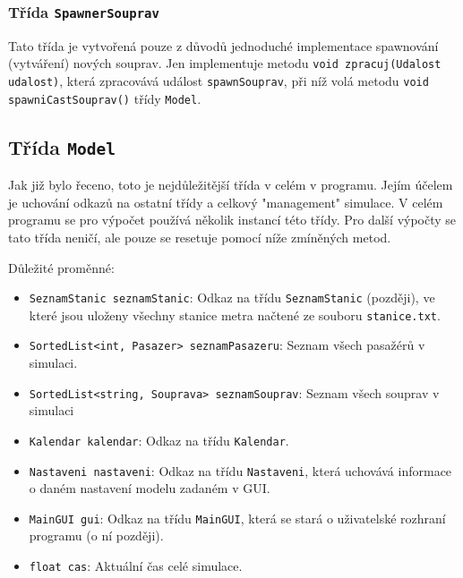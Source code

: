 \documentclass[12pt, a4paper]{article}
\begin{document}
\subsubsection{Třída \texttt{SpawnerSouprav}}
Tato třída je vytvořená pouze z důvodů jednoduché implementace spawnování (vytváření) nových souprav. Jen implementuje metodu \texttt{void zpracuj(Udalost udalost)}, která zpracovává událost \texttt{spawnSouprav}, při níž volá metodu \texttt{void spawniCastSouprav()} třídy \texttt{Model}.

\subsection{Třída \texttt{Model}}
Jak již bylo řeceno, toto je nejdůležitější třída v celém v programu. Jejím účelem je uchování odkazů na ostatní třídy a celkový "management" simulace. V celém programu se pro výpočet používá několik instancí této třídy. Pro další výpočty se tato třída neničí, ale pouze se resetuje pomocí níže zmíněných metod.

Důležité proměnné:
\begin{itemize}
    \item \texttt{SeznamStanic seznamStanic}: Odkaz na třídu \texttt{SeznamStanic} (později), ve které jsou uloženy všechny stanice metra načtené ze souboru \texttt{stanice.txt}.
    \item \texttt{SortedList<int, Pasazer> seznamPasazeru}: Seznam všech pasažérů v simulaci.
    \item \texttt{SortedList<string, Souprava> seznamSouprav}: Seznam všech souprav v simulaci
    \item \texttt{Kalendar kalendar}: Odkaz na třídu \texttt{Kalendar}.
    \item \texttt{Nastaveni nastaveni}: Odkaz na třídu \texttt{Nastaveni}, která uchovává informace o daném nastavení modelu zadaném v GUI.
    \item \texttt{MainGUI gui}: Odkaz na třídu \texttt{MainGUI}, která se stará o uživatelské rozhraní programu (o ní později).
    \item \texttt{float cas}: Aktuální čas celé simulace.
\end{itemize}
\end{document}

